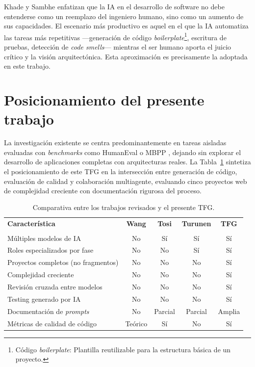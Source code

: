 Khade y Sambhe \cite{Khade:2025:AIinSD} enfatizan que la \ac{IA} en el desarrollo de software no debe entenderse como un reemplazo del ingeniero humano, sino como un aumento de sus capacidades. El escenario más productivo es aquel en el que la \ac{IA} automatiza las tareas más repetitivas ---generación de código \textit{boilerplate}\footnote{Código \textit{boilerplate}: Plantilla reutilizable para la estructura básica de un proyecto.}, escritura de pruebas, detección de \textit{code smells}--- mientras el ser humano aporta el juicio crítico y la visión arquitectónica. Esta aproximación es precisamente la adoptada en este trabajo.

\section{Posicionamiento del presente trabajo} \label{sec:posicionamiento}

La investigación existente se centra predominantemente en tareas aisladas evaluadas con \textit{benchmarks} como HumanEval \cite{Chen:2021:Codex} o MBPP \cite{Wang:2023:LLMReview}, dejando sin explorar el desarrollo de aplicaciones completas con arquitecturas reales. La Tabla~\ref{tab:comparativa-trabajos} sintetiza el posicionamiento de este \ac{TFG} en la intersección entre generación de código, evaluación de calidad y colaboración multiagente, evaluando cinco proyectos web de complejidad creciente con documentación rigurosa del proceso.

\begin{table}[htbp]
\centering
\begin{tabular}{lcccc}
\hline
\textbf{Característica} & \textbf{Wang} & \textbf{Tosi} & \textbf{Turunen} & \textbf{TFG} \\
 & \cite{Wang:2023:LLMReview} & \cite{Tosi:2024:CodeQuality} & \cite{Turunen:2023:FromIdeas} & \\
\hline
Múltiples modelos de IA          & No  & Sí  & Sí  & Sí \\
Roles especializados por fase    & No  & No  & Sí  & Sí \\
Proyectos completos (no fragmentos) & No  & No  & No  & Sí \\
Complejidad creciente            & No  & No  & No  & Sí \\
Revisión cruzada entre modelos   & No  & No  & No  & Sí \\
Testing generado por IA          & No  & No  & No  & Sí \\
Documentación de \textit{prompts}         & No  & Parcial & Parcial & Amplia \\
Métricas de calidad de código    & Teórico & Sí  & No  & Sí \\
\hline
\end{tabular}
\caption{Comparativa entre los trabajos revisados y el presente \ac{TFG}.}
\label{tab:comparativa-trabajos}
\end{table}

